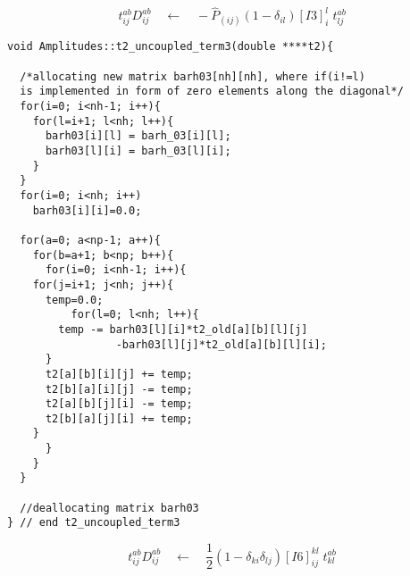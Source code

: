 %
\begin{equation*}
t_{ij}^{ab}D_{ij}^{ab}\quad \leftarrow \quad -\hat{P}_{(ij)}(1-\delta_{il})[I3]_{i}^{l}\phantom{.}t_{lj}^{ab}
\end{equation*}

\begin{lstlisting}[label={list:impl:t2term3},caption={implementation of the amp1 class function t2\_uncoupled\_term3()}]
void Amplitudes::t2_uncoupled_term3(double ****t2){

  /*allocating new matrix barh03[nh][nh], where if(i!=l) 
  is implemented in form of zero elements along the diagonal*/
  for(i=0; i<nh-1; i++){
    for(l=i+1; l<nh; l++){
      barh03[i][l] = barh_03[i][l];
      barh03[l][i] = barh_03[l][i];
    }
  }
  for(i=0; i<nh; i++)
    barh03[i][i]=0.0;
  
  for(a=0; a<np-1; a++){
    for(b=a+1; b<np; b++){
      for(i=0; i<nh-1; i++){
	for(j=i+1; j<nh; j++){
	  temp=0.0;
          for(l=0; l<nh; l++){
	    temp -= barh03[l][i]*t2_old[a][b][l][j] 
                 -barh03[l][j]*t2_old[a][b][l][i];
	  }
	  t2[a][b][i][j] += temp;
	  t2[b][a][i][j] -= temp;
	  t2[a][b][j][i] -= temp;
	  t2[b][a][j][i] += temp;
	}
      }
    }
  }
  
  //deallocating matrix barh03
} // end t2_uncoupled_term3
\end{lstlisting}

\begin{equation*}
 t_{ij}^{ab}D_{ij}^{ab}\quad \leftarrow \quad \frac{1}{2}(1-\delta_{ki}\delta_{lj})[I6]_{ij}^{kl}\phantom{.}t_{kl}^{ab}
\end{equation*}

